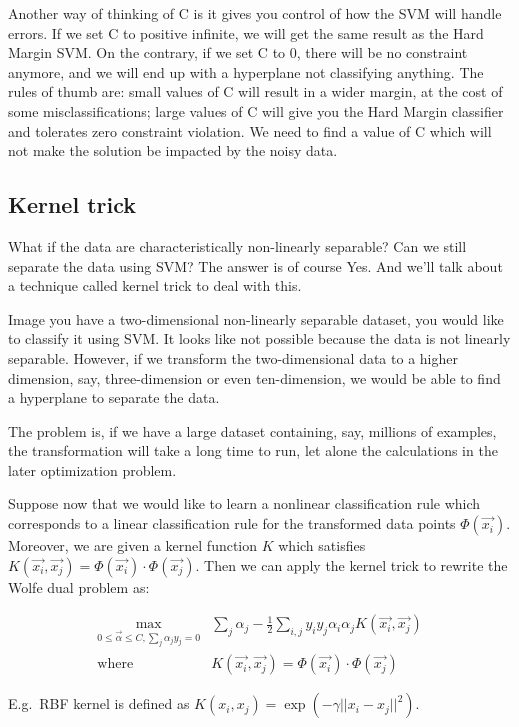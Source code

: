 \documentclass{article}
\begin{document}
Another way of thinking of C is it gives you control of how the SVM will handle errors. If we set C to positive infinite, we will get the same result as the Hard Margin SVM. On the contrary, if we set C to 0, there will be no constraint anymore, and we will end up with a hyperplane not classifying anything. The rules of thumb are: small values of C will result in a wider margin, at the cost of some misclassifications; large values of C will give you the Hard Margin classifier and tolerates zero constraint violation. We need to find a value of C which will not make the solution be impacted by the noisy data.

\subsection{Kernel trick}
What if the data are characteristically non-linearly separable? Can we still separate the data using SVM? The answer is of course Yes. And we’ll talk about a technique called kernel trick to deal with this.

Image you have a two-dimensional non-linearly separable dataset, you would like to classify it using SVM. It looks like not possible because the data is not linearly separable. However, if we transform the two-dimensional data to a higher dimension, say, three-dimension or even ten-dimension, we would be able to find a hyperplane to separate the data.

The problem is, if we have a large dataset containing, say, millions of examples, the transformation will take a long time to run, let alone the calculations in the later optimization problem.


Suppose now that we would like to learn a nonlinear classification rule which corresponds to a linear classification rule for the transformed data points $\Phi (\vec{x_i})$. Moreover, we are given a kernel function $K$ which satisfies $K(\vec{x_i}, \vec{x_j}) = \Phi (\vec{x_i}) \cdot \Phi (\vec{x_j})$. Then we can apply the kernel trick to rewrite the Wolfe dual problem as:

\begin{align*}
\max_{0 \leq \vec{\alpha}\leq C, \sum_j \alpha_j y_j = 0} & \sum_j \alpha_j - \frac{1}{2} \sum_{i,j} y_iy_j\alpha_i\alpha_j K(\vec{x_i}, \vec{x_j}) \\
\mathrm{where} \quad & K(\vec{x_i}, \vec{x_j}) = \Phi (\vec{x_i}) \cdot \Phi (\vec{x_j})
\end{align*}


E.g.\ RBF kernel is defined as $K(x_i,x_j)= \exp (- \gamma || x_i - x_j ||^2)$.
\end{document}
